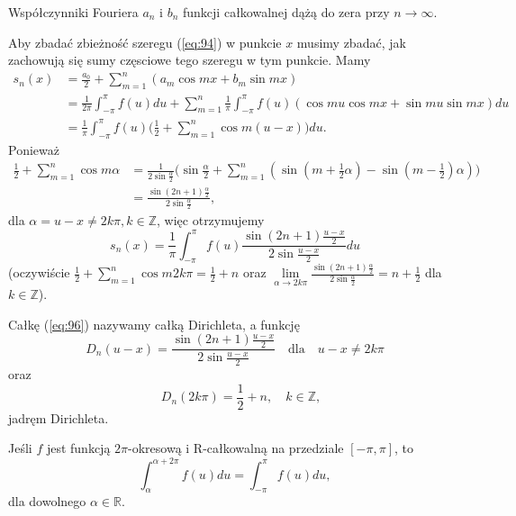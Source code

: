 \documentclass[leqno]{article}
\begin{document}
\begin{justify}
\begin{wniosek}
{
    Współczynniki Fouriera $a_n$ i $b_n$ funkcji całkowalnej dążą do zera przy $n \to \infty$. 
}
\end{wniosek}

Aby zbadać zbieżność szeregu (\ref{eq:94}) w punkcie $x$ musimy zbadać, jak zachowują się sumy częsciowe tego szeregu w tym punkcie. Mamy
\begin{align*}
    s_n(x) &= \frac{a_0}{2} + \sum_{m=1}^{n}(a_m \cos mx + b_m \sin mx) \\ 
           &= \frac{1}{2\pi}\int_{-\pi}^{\pi}f(u)du + \sum_{m=1}^{n}\frac{1}{\pi}\int_{-\pi}^{\pi}f(u)(\cos mu \cos mx + \sin mu \sin mx)du \\
           &= \frac{1}{\pi}\int_{-\pi}^{\pi}f(u)\Bigg(\frac{1}{2} + \sum_{m=1}^{n} \cos m(u - x)\Bigg) du.
\end{align*}
Ponieważ
\begin{align*}
    \frac{1}{2} + \sum_{m=1}^{n} \cos m \alpha &= \frac{1}{2\sin \frac{\alpha}{2}} \Bigg( \sin \frac{\alpha}{2} + \sum_{m=1}^{n}(\sin (m+\frac{1}{2}\alpha) - \sin (m - \frac{1}{2}) \alpha) \Bigg) \\
    &= \frac{\sin (2n + 1)\frac{\alpha}{2}}{2 \sin \frac{\alpha}{2}},
\end{align*}
dla $\alpha = u - x \neq 2k \pi, k \in \mathbb{Z}$, więc otrzymujemy
\begin{equation}\label{eq:96}
    s_n(x) = \frac{1}{\pi}\int_{-\pi}^{\pi}f(u) \frac{\sin (2n + 1)\frac{u-x}{2}}{2 \sin \frac{u-x}{2}}du
\end{equation}
(oczywiście $\frac{1}{2} + \sum\limits_{m=1}^{n}\cos m 2k\pi = \frac{1}{2} + n$ oraz $\lim\limits_{\alpha \to 2k \pi} \frac{\sin (2n + 1)\frac{\alpha}{2}}{2 \sin \frac{\alpha}{2}} = n + \frac{1}{2}$ dla $k \in \mathbb{Z}$).

\begin{defn}
    Całkę (\ref{eq:96}) nazywamy całką Dirichleta, a funkcję 
    \[
        D_n(u - x) = \frac{\sin (2n + 1) \frac{u-x}{2}}{2 \sin \frac{u-x}{2}} \quad \text{dla} \quad u-x \neq 2k\pi
    \]
    oraz
    \[
        \quad D_n(2k\pi) = \frac{1}{2} + n, \quad k \in \mathbb{Z},
    \]
    jadręm Dirichleta.
\end{defn}

\begin{lemat}
{
    Jeśli $f$ jest funkcją $2\pi$-okresową i R-całkowalną na przedziale $[-\pi, \pi]$, to
    \[
        \int_{\alpha}^{\alpha + 2\pi} f(u) du = \int_{-\pi}^{\pi}f(u) du,
    \]
    dla dowolnego $\alpha \in \mathbb{R}$.
}
\end{lemat}


\end{justify}
\end{document}
